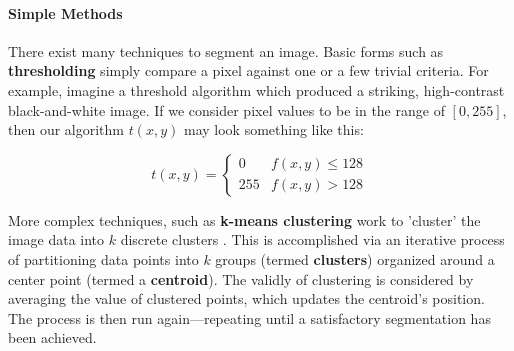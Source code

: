 \documentclass{report}
\newcommand{\tech}[1]{\textbf{#1}}
\begin{document}
\paragraph{Simple Methods}

There exist many techniques to segment an image. Basic forms such as \tech{thresholding} simply compare a pixel against one or a few trivial criteria. For example, imagine a threshold algorithm which produced a striking, high-contrast black-and-white image. If we consider pixel values to be in the range of $[0, 255]$, then our algorithm $t(x,y)$ may look something like this:

$$t(x,y) = \begin{cases} 0 & f(x,y) \leq 128 \\ 255 & f(x,y) > 128 \end{cases}$$

More complex techniques, such as \tech{k-means clustering} work to 'cluster' the image data into $k$ discrete clusters \cite{kmeans}. This is accomplished via an iterative process of partitioning data points into $k$ groups (termed \tech{clusters}) organized around a center point (termed a \tech{centroid}). The validly of clustering is considered by averaging the value of clustered points, which updates the centroid's position. The process is then run again---repeating until a satisfactory segmentation has been achieved.
\end{document}
